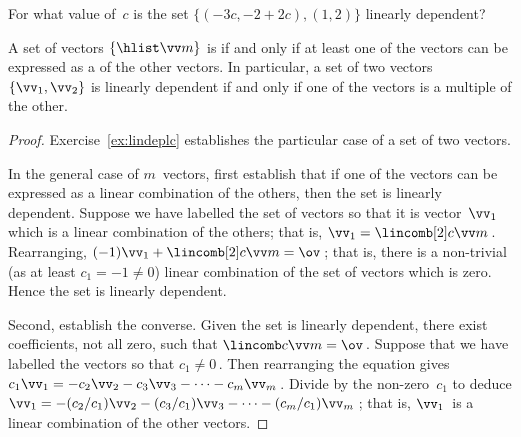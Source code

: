 \begin{activity}
For what value of~\(c\) is the set \(\{(-3c,-2+2c),(1,2)\}\) linearly dependent?
\end{activity}




\begin{theorem} \label{thm:lindeplc} 
A set of vectors \(\{\hlist\vv m\}\) is  if and only if at least one of the vectors can be expressed as a  of the other vectors.
In particular, a set of two vectors \(\{\vv_1,\vv_2\}\) is linearly dependent if and only if one of the vectors is a multiple of the other.
\end{theorem}

\begin{proof} 
Exercise~\ref{ex:lindeplc} establishes the particular case of a set of two vectors.

In the general case of \(m\)~vectors, first establish that if one of the vectors can be expressed as a {linear combination} of the others, then the set is linearly dependent.
Suppose we have labelled the set of vectors so that it is vector~\(\vv_1\) which is a linear combination of the others; that is, \(\vv_1=\lincomb[2]c\vv m\)\,.
Rearranging, \((-1)\vv_1+\lincomb[2]c\vv m=\ov\)\,; that is, there is a non-trivial (as at least \(c_1=-1\neq0\)) linear combination of the set of vectors which is zero.
Hence the set is linearly dependent.

Second, establish the converse.  
Given the set is linearly dependent, there exist coefficients, not all zero, such that \(\lincomb c\vv m=\ov\)\,.  
Suppose that we have labelled the vectors so that \(c_1\neq 0\)\,.  
Then rearranging the equation gives
\(c_1\vv_1=-c_2\vv_2-c_3\vv_3-\cdots-c_m\vv_m\)\,.
Divide by the non-zero~\(c_1\) to deduce
\(\vv_1=-(c_2/c_1)\vv_2-(c_3/c_1)\vv_3-\cdots-(c_m/c_1)\vv_m\)\,;
that is, \(\vv_1\)~is a linear combination of the other vectors.
\end{proof}


